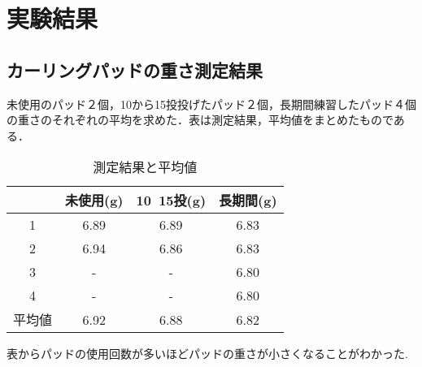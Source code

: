 \documentclass[main]{subfiles}
\begin{document}
\chapter{実験結果}
\section{カーリングパッドの重さ測定結果}
未使用のパッド２個，10から15投投げたパッド２個，長期間練習したパッド４個
の重さのそれぞれの平均を求めた．表は測定結果，平均値をまとめたものである．
\\   

\begin{table}
    \centering
    \caption{測定結果と平均値}
    \label{table:tab}
  \begin{tabular}{c|c|c|c}

     & 未使用(g) & 10~15投(g) & 長期間(g)\\ \hline
    1 & 6.89 & 6.89 & 6.83\\ \hline
    2 & 6.94 & 6.86 & 6.83\\ \hline
    3 & - & - & 6.80 \\ \hline
    4 & - & - & 6.80 \\ \hline
    平均値& 6.92 & 6.88 & 6.82  \\
  \end{tabular}
\end{table}
表からパッドの使用回数が多いほどパッドの重さが小さくなることがわかった.
\end{document}
